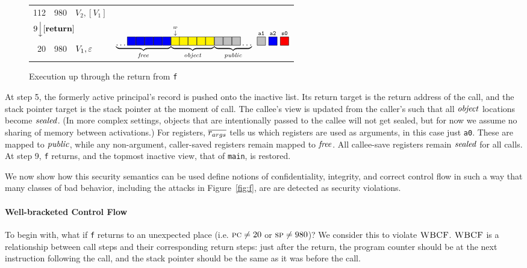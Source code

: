 \documentclass[10pt,conference]{ieeetran}%
\theoremstyle{definition}
\begin{document}
\begin{figure}
\begin{tabular}{|r|r||l|r}
    \cline{1-3}
    112 & 980 & \(V_2,[V_1]\) \\
    \cline{1-3}
    \multicolumn{3}{l}{\multirow{2}{*}{\(9 \Big\downarrow [\mathbf{return}]\)}} & \\
    \multicolumn{3}{l}{} & \multirow{3}{*}{\(\underbrace{\dots \freebox \freebox \freebox \freebox \freebox}_\unsealed
      \! \underbrace{\stackrel{\stackrel{\SP}{\downarrow}}{\objbox} \!\! \objbox \objbox \objbox \objbox}_\object
      \! \underbrace{\pubbox \pubbox \pubbox \dots}_\public
      ~ \stackrel{\mathtt{a1}}{\pubbox} ~ \stackrel{\mathtt{a2}}{\freebox}
      ~ \stackrel{\mathtt{s0}}{\sealbox}
      \)}
    \\
    \cline{1-3}
    20 & 980  & \(V_1, \varepsilon\) &
    \\
    \cline{1-3}
    \multicolumn{2}{l}{} \\
  \end{tabular}
\caption{Execution up through the return from {\tt f}}
\label{fig:exec1}
\end{figure}
%
At step 5, the formerly active principal's record is pushed onto the inactive list.
Its return target is the return address of the call,
and the stack pointer target is the stack pointer at the moment of call.
The callee's view is updated from the caller's such that all \(\mathit{object}\) locations
become \(\mathit{sealed}\). (In more complex settings, objects that are intentionally passed
to the callee will not get sealed, but for now we assume no sharing of memory between activations.)
For registers, \(\overline{r_{args}}\) tells us which registers are used as arguments,
in this case just {\tt a0}. These are mapped to \(\mathit{public}\), while any non-argument, caller-saved
registers remain mapped to \(\mathit{free}\). All callee-save registers remain \(\mathit{sealed}\) for all calls.
At step 9, {\tt f} returns, and the topmost inactive view, that of {\tt main}, is restored.

We now show how this security semantics can be used define notions of confidentiality,
integrity, and correct control flow in such a way that many classes of
bad behavior, including the attacks in Figure~\ref{fig:f}, are
are detected as security violations.

\paragraph*{Well-bracketed Control Flow}

To begin with, what if {\tt f} returns to an unexpected place (i.e. \(\textsc{pc} \neq 20\) or
\(\textsc{sp} \neq 980\))? We consider this to violate \(\textnormal{\sc WBCF}\). \(\textnormal{\sc WBCF}\) is a relationship between
call steps and their corresponding return steps: just after the return, the program
counter should be at the next instruction following the call,
and the stack pointer should be the same as it was before the call.
\end{document}
